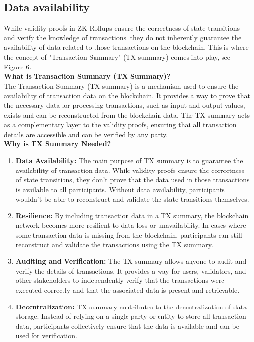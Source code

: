 \documentclass{report}
\begin{document}
\subsection{Data availability}
While validity proofs in ZK Rollups ensure the correctness of state transitions and verify the knowledge of transactions, they do not inherently guarantee the availability of data related to those transactions on the blockchain. This is where the concept of "Transaction Summary" (TX summary) comes into play, see Figure 6.\\
\textbf{What is Transaction Summary (TX Summary)?}\\
The Transaction Summary (TX summary) is a mechanism used to ensure the availability of transaction data on the blockchain. It provides a way to prove that the necessary data for processing transactions, such as input and output values, exists and can be reconstructed from the blockchain data. The TX summary acts as a complementary layer to the validity proofs, ensuring that all transaction details are accessible and can be verified by any party.\\
\textbf{Why is TX Summary Needed?}
\begin{enumerate}
	\item \textbf{Data Availability:}  The main purpose of TX summary is to guarantee the availability of transaction data. While validity proofs ensure the correctness of state transitions, they don't prove that the data used in those transactions is available to all participants. Without data availability, participants wouldn't be able to reconstruct and validate the state transitions themselves.
	\item \textbf{Resilience:} By including transaction data in a TX summary, the blockchain network becomes more resilient to data loss or unavailability. In cases where some transaction data is missing from the blockchain, participants can still reconstruct and validate the transactions using the TX summary.
	\item \textbf{Auditing and Verification:} The TX summary allows anyone to audit and verify the details of transactions. It provides a way for users, validators, and other stakeholders to independently verify that the transactions were executed correctly and that the associated data is present and retrievable.
	\item \textbf{Decentralization:} TX summary contributes to the decentralization of data storage. Instead of relying on a single party or entity to store all transaction data, participants collectively ensure that the data is available and can be used for verification.
\end{enumerate}
\end{document}

